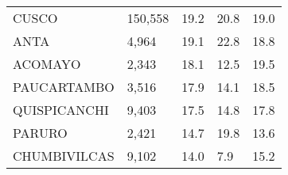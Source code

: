 \begin{tabular}{lllll}
	\cellcolor[HTML]{FF5050}CUSCO                                  & 150,558                                                               & 19.2                                                                             & 20.8                                                                        & 19.0                                                                                \\
	\cellcolor[HTML]{FF5050}ANTA                                   & 4,964                                                                 & 19.1                                                                             & 22.8                                                                        & 18.8                                                                                \\
	\cellcolor[HTML]{FF5050}ACOMAYO                                & 2,343                                                                 & 18.1                                                                             & 12.5                                                                        & 19.5                                                                                \\
	\cellcolor[HTML]{FF5050}PAUCARTAMBO                            & 3,516                                                                 & 17.9                                                                             & 14.1                                                                        & 18.5                                                                                \\
	\cellcolor[HTML]{FF5050}QUISPICANCHI                           & 9,403                                                                 & 17.5                                                                             & 14.8                                                                        & 17.8                                                                                \\
	\cellcolor[HTML]{FF5050}PARURO                                 & 2,421                                                                 & 14.7                                                                             & 19.8                                                                        & 13.6                                                                                \\
	\cellcolor[HTML]{FF5050}CHUMBIVILCAS                           & 9,102                                                                 & 14.0                                                                             & 7.9                                                                         & 15.2                                                                                \\

\end{tabular}
